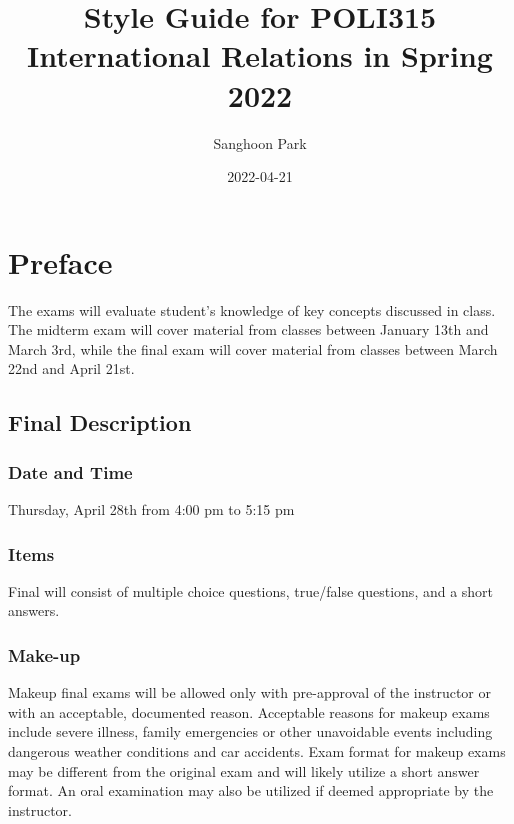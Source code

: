 \documentclass[
]{book}
\title{Style Guide for POLI315 International Relations in Spring 2022}
\author{Sanghoon Park}
\date{2022-04-21}
\begin{document}
\maketitle

{
\setcounter{tocdepth}{1}
\tableofcontents
}
\hypertarget{preface}{%
\chapter*{Preface}\label{preface}}

The exams will evaluate student's knowledge of key concepts discussed in class. The midterm exam will cover material from classes between January 13th and March 3rd, while the final exam will cover material from classes between March 22nd and April 21st.

\hypertarget{final-description}{%
\section*{Final Description}\label{final-description}}

\hypertarget{date-and-time}{%
\subsection*{Date and Time}\label{date-and-time}}

Thursday, April 28th from 4:00 pm to 5:15 pm

\hypertarget{items}{%
\subsection*{Items}\label{items}}

Final will consist of multiple choice questions, true/false questions, and a short answers.

\hypertarget{make-up}{%
\subsection*{Make-up}\label{make-up}}

Makeup final exams will be allowed only with pre-approval of the instructor or with an acceptable, documented reason. Acceptable reasons for makeup exams include severe illness, family emergencies or other unavoidable events including dangerous weather conditions and car accidents. Exam format for makeup exams may be different from the original exam and will likely utilize a short answer format. An oral examination may also be utilized if deemed appropriate by the instructor.
\end{document}
